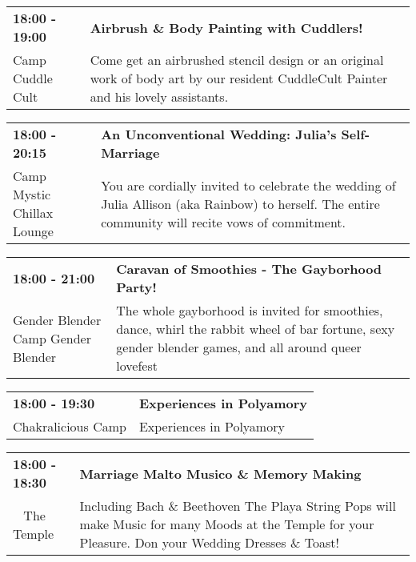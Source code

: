 \begin{tabular}{ p{1in} p{2.2in} }
    \textbf{18:00 - 19:00} & \textbf{Airbrush \& Body Painting with Cuddlers!} \\
    Camp Cuddle Cult \newline  & Come get an airbrushed stencil design or an original work of body art by our resident CuddleCult Painter and his lovely assistants. \\
    \hline 
\end{tabular}
    
\begin{tabular}{ p{1in} p{2.2in} }
    \textbf{18:00 - 20:15} & \textbf{An Unconventional Wedding: Julia's Self-Marriage} \\
    Camp Mystic \newline Chillax Lounge & You are cordially invited to celebrate the wedding of Julia Allison (aka Rainbow) to herself. The entire community will recite vows of commitment. \\
    \hline 
\end{tabular}
    
\begin{tabular}{ p{1in} p{2.2in} }
    \textbf{18:00 - 21:00} & \textbf{Caravan of Smoothies - The Gayborhood Party!} \\
    Gender Blender \newline Camp Gender Blender & The whole gayborhood is invited for smoothies, dance, whirl the rabbit wheel of bar fortune, sexy gender blender games, and all around queer lovefest \\
    \hline 
\end{tabular}
    
\begin{tabular}{ p{1in} p{2.2in} }
    \textbf{18:00 - 19:30} & \textbf{Experiences in Polyamory} \\
    Chakralicious Camp \newline  & Experiences in Polyamory \\
    \hline 
\end{tabular}
    
\begin{tabular}{ p{1in} p{2.2in} }
    \textbf{18:00 - 18:30} & \textbf{Marriage Malto Musico \& Memory Making} \\
    ~ \newline The Temple & Including Bach \& Beethoven The Playa String Pops will make Music for many Moods at the Temple for your Pleasure.
Don your Wedding Dresses \& Toast! \\
    \hline 
\end{tabular}
    
